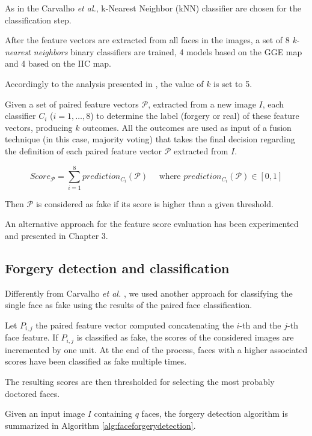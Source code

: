 As in the Carvalho \emph{et al.}\cite{carvalho2016illuminant}, k-Nearest Neighbor (kNN) classifier\cite{bishop2007pattern} are chosen for the classification step.

After the feature vectors are extracted from all faces in the images, a set of 8 \emph{k-nearest neighbors} binary classifiers are trained, 4 models based on the GGE map and 4 based on the IIC map. 

Accordingly to the analysis presented in \cite{carvalho2016illuminant}, the value of $k$ is set to 5.

Given a set of paired feature vectors $\mathcal{P}$, extracted from a new image $I$, each classifier $C_i$ ($i = 1, \ldots, 8$) to determine the label (forgery or real) of these feature vectors, producing $k$ outcomes. All the outcomes are used as input of a fusion technique (in this case, majority voting) that takes the final decision regarding the definition of each paired feature vector $\mathcal{P}$ extracted from $I$.

$$
Score_{\mathcal{P}} = \sum_{i = 1}^{8} prediction_{C_i}(\mathcal{P}) \quad \textrm{ where } prediction_{C_i}(\mathcal{P}) \in [0, 1]
$$

Then $\mathcal{P}$ is considered as fake if its score is higher than a given threshold. 

An alternative approach for the feature score evaluation has been experimented and presented in Chapter 3.

\subsection{Forgery detection and classification}

Differently from Carvalho \emph{et al.} \cite{carvalho2016illuminant}, we used another approach for classifying the single face as fake using the results of the paired face classification. 

Let $P_{i, j}$ the paired feature vector computed concatenating the $i$-th and the $j$-th face feature. If $P_{i, j}$ is classified as fake, the scores of the considered images are incremented by one unit. At the end of the process, faces with a higher associated scores have been classified as fake multiple times.

The resulting scores are then thresholded for selecting the most probably doctored faces. 

Given an input image $I$ containing $q$ faces, the forgery detection algorithm is summarized in Algorithm \ref{alg:faceforgerydetection}.

